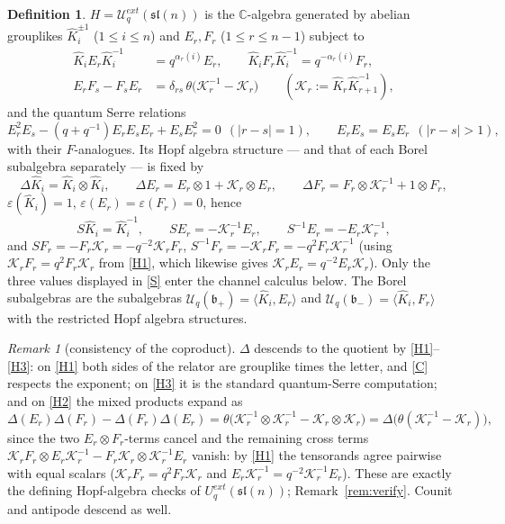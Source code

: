 \documentclass[11pt]{article}
\theoremstyle{definition}
\newtheorem{definition}[theorem]{Definition}
\theoremstyle{remark}
\newtheorem{remark}[theorem]{Remark}
\newcommand{\la}{\langle}
\newcommand{\ra}{\rangle}
\newcommand{\C}{\mathbb{C}}
\newcommand{\Uq}{\mathcal{U}_q}
\newcommand{\bp}{\mathfrak{b}_+}
\newcommand{\bm}{\mathfrak{b}_-}
\newcommand{\del}{\delta}
\newcommand{\hK}{\hat K}
\newcommand{\cK}{\mathcal K}
\newcommand{\vep}{\varepsilon}
\newcommand{\tht}{\theta}
\newcommand{\coloneqq}{\mathrel{:=}}
\begin{document}
\begin{definition}\label{def:H}
$H=\Uq^{ext}(\mathfrak{sl}(n))$ is the $\C$-algebra generated by
abelian grouplikes $\hK_i^{\pm1}$ ($1\le i\le n$) and $E_r,F_r$
($1\le r\le n-1$) subject to
\begin{align}
\hK_iE_r\hK_i^{-1}&=q^{\alpha_r(i)}E_r,\qquad
\hK_iF_r\hK_i^{-1}=q^{-\alpha_r(i)}F_r,\label{H1}\tag{H1}\\
E_rF_s-F_sE_r&=\del_{rs}\,\tht\bigl(\cK_r^{-1}-\cK_r\bigr)
\qquad(\cK_r\coloneqq\hK_r\hK_{r+1}^{-1}),\label{H2}\tag{H2}
\end{align}
and the quantum Serre relations
\begin{equation}
E_r^2E_s-(q+q^{-1})E_rE_sE_r+E_sE_r^2=0\ \ (|r-s|=1),\qquad
E_rE_s=E_sE_r\ \ (|r-s|>1),\label{H3}\tag{H3}
\end{equation}
with their $F$-analogues.  Its Hopf algebra structure — and that of
each Borel subalgebra separately — is fixed by
\begin{equation}
\Delta\hK_i=\hK_i\otimes\hK_i,\qquad
\Delta E_r=E_r\otimes1+\cK_r\otimes E_r,\qquad
\Delta F_r=F_r\otimes\cK_r^{-1}+1\otimes F_r,\label{C}\tag{C}
\end{equation}
$\vep(\hK_i)=1$, $\vep(E_r)=\vep(F_r)=0$, hence
\begin{equation}
S\hK_i=\hK_i^{-1},\qquad SE_r=-\cK_r^{-1}E_r,\qquad
S^{-1}E_r=-E_r\cK_r^{-1},\label{S}\tag{S}
\end{equation}
and $SF_r=-F_r\cK_r=-q^{-2}\cK_rF_r$,
$S^{-1}F_r=-\cK_rF_r=-q^{2}F_r\cK_r^{-1}$ (using
$\cK_rF_r=q^{2}F_r\cK_r$ from \eqref{H1}, which likewise gives
$\cK_rE_r=q^{-2}E_r\cK_r$).  Only the three values displayed in
\eqref{S} enter the channel calculus below.
The Borel subalgebras are the subalgebras
$\Uq(\bp)=\la\hK_i,E_r\ra$ and $\Uq(\bm)=\la\hK_i,F_r\ra$ with the
restricted Hopf algebra structures.
\end{definition}

\begin{remark}[consistency of the coproduct]\label{rem:hopfok}
$\Delta$ descends to the quotient by \eqref{H1}--\eqref{H3}: on
\eqref{H1} both sides of the relator are grouplike times the letter,
and \eqref{C} respects the exponent; on \eqref{H3} it is the standard
quantum-Serre computation; and on \eqref{H2} the mixed products
expand as
\[
\Delta(E_r)\Delta(F_r)-\Delta(F_r)\Delta(E_r)
=\tht\bigl(\cK_r^{-1}\otimes\cK_r^{-1}-\cK_r\otimes\cK_r\bigr)
=\Delta\bigl(\tht(\cK_r^{-1}-\cK_r)\bigr),
\]
since the two $E_r\otimes F_r$-terms cancel and the remaining cross
terms $\cK_rF_r\otimes E_r\cK_r^{-1}-F_r\cK_r\otimes\cK_r^{-1}E_r$
vanish: by \eqref{H1} the tensorands agree pairwise with equal
scalars ($\cK_rF_r=q^{2}F_r\cK_r$ and
$E_r\cK_r^{-1}=q^{-2}\cK_r^{-1}E_r$).  These are exactly the defining
Hopf-algebra checks of $U_q^{ext}(\mathfrak{sl}(n))$;
Remark~\ref{rem:verify}.  Counit and antipode descend as well.
\end{remark}
\end{document}
